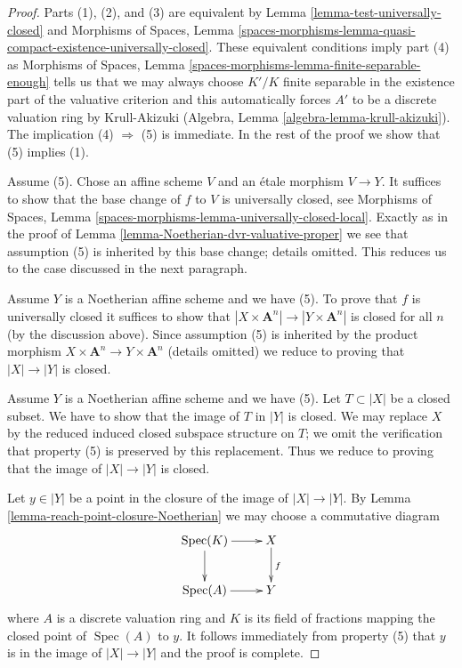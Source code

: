 \documentclass{stacks-project}
\theoremstyle{plain}
\theoremstyle{definition}
\theoremstyle{remark}
\numberwithin{equation}{subsection}
\def\Spec{\mathop{\mathrm{Spec}}}
\begin{document}
\begin{proof}
Parts (1), (2), and (3) are equivalent by
Lemma \ref{lemma-test-universally-closed} and
Morphisms of Spaces, Lemma
\ref{spaces-morphisms-lemma-quasi-compact-existence-universally-closed}.
These equivalent conditions imply part (4) as
Morphisms of Spaces, Lemma \ref{spaces-morphisms-lemma-finite-separable-enough}
tells us that we may always choose $K'/K$ finite separable in
the existence part of the valuative criterion and this
automatically forces $A'$ to be a discrete valuation ring by Krull-Akizuki
(Algebra, Lemma \ref{algebra-lemma-krull-akizuki}).
The implication (4) $\Rightarrow$ (5) is immediate.
In the rest of the proof we show that (5) implies (1).

\medskip\noindent
Assume (5). Chose an affine scheme $V$ and an \'etale morphism $V \to Y$.
It suffices to show that the base change of $f$ to $V$ is universally closed,
see Morphisms of Spaces, Lemma
\ref{spaces-morphisms-lemma-universally-closed-local}.
Exactly as in the proof of Lemma \ref{lemma-Noetherian-dvr-valuative-proper}
we see that assumption (5) is inherited by this base change; details
omitted. This reduces us to the case discussed in the next paragraph.

\medskip\noindent
Assume $Y$ is a Noetherian affine scheme and we have (5).
To prove that $f$ is universally closed it suffices to show that
$|X \times \mathbf{A}^n| \to |Y \times \mathbf{A}^n|$ is closed
for all $n$ (by the discussion above). Since assumption (5)
is inherited by the product morphism
$X \times \mathbf{A}^n \to Y \times \mathbf{A}^n$ (details omitted)
we reduce to proving that $|X| \to |Y|$ is closed.

\medskip\noindent
Assume $Y$ is a Noetherian affine scheme and we have (5).
Let $T \subset |X|$ be a closed subset. We have to show that
the image of $T$ in $|Y|$ is closed. We may replace $X$
by the reduced induced closed subspace structure on $T$; we
omit the verification that property (5) is preserved by
this replacement. Thus we reduce to proving that the image
of $|X| \to |Y|$ is closed.

\medskip\noindent
Let $y \in |Y|$ be a point in the closure of the image of
$|X| \to |Y|$. By Lemma \ref{lemma-reach-point-closure-Noetherian}
we may choose a commutative diagram
$$
\xymatrix{
\Spec(K) \ar[r] \ar[d] & X \ar[d]^f \\
\Spec(A) \ar[r] & Y
}
$$
where $A$ is a discrete valuation ring and $K$ is its field of fractions
mapping the closed point of $\Spec(A)$ to $y$. It follows immediately
from property (5) that $y$ is in the image of
$|X| \to |Y|$ and the proof is complete.
\end{proof}
\end{document}
